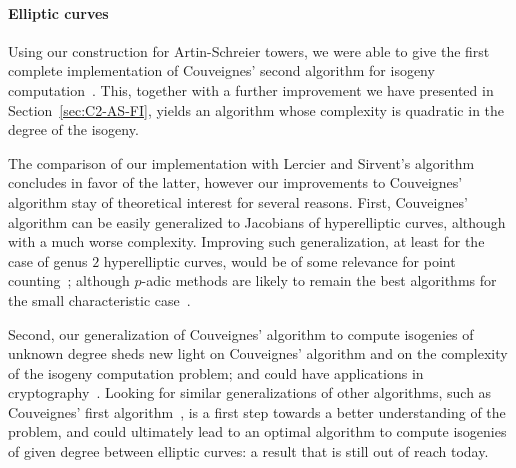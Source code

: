 \paragraph{Elliptic curves}
Using our construction for Artin-Schreier towers, we were able to give
the first complete implementation of Couveignes' second algorithm for
isogeny computation~\cite{couveignes96}. This, together with a further
improvement we have presented in Section~\ref{sec:C2-AS-FI}, yields an
algorithm whose complexity is quadratic in the degree of the isogeny.

The comparison of our implementation with Lercier and Sirvent's
algorithm~\cite{lercier+sirvent08} concludes in favor of the latter,
however our improvements to Couveignes' algorithm stay of theoretical
interest for several reasons. First, Couveignes' algorithm can be
easily generalized to Jacobians of hyperelliptic curves, although with
a much worse complexity. Improving such generalization, at least for
the case of genus $2$ hyperelliptic curves, would be of some relevance
for point counting~\cite{schoof95,pila90,gaudry+schost04}; although
$p$-adic methods are likely to remain the best algorithms for the
small characteristic
case~\cite{kedlaya01,denef+vercauteren06}. 

Second, our generalization of Couveignes' algorithm to compute
isogenies of unknown degree sheds new light on Couveignes' algorithm
and on the complexity of the isogeny computation problem; and could
have applications in
cryptography~\cite{teske06,rostovtsev+stolbunov06}.  Looking for
similar generalizations of other algorithms, such as Couveignes' first
algorithm~\cite{couveignes94}, is a first step towards a better
understanding of the problem, and could ultimately lead to an optimal
algorithm to compute isogenies of given degree between elliptic
curves: a result that is still out of reach today.


